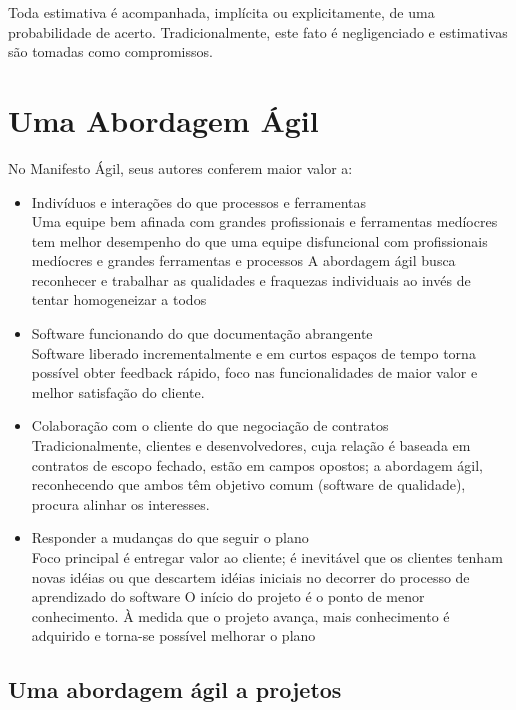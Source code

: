 \documentclass[a4paper,abntfigtabnum,noindentfirst]{abnt}
\begin{document}
Toda estimativa é acompanhada, implícita ou explicitamente, de uma probabilidade de acerto. Tradicionalmente, este fato é negligenciado e estimativas são tomadas como compromissos.


\chapter{Uma Abordagem Ágil}

No Manifesto Ágil, seus autores conferem maior valor a:

\begin{itemize}
\item Indivíduos e interações do que processos e ferramentas\\
Uma equipe bem afinada com grandes profissionais e ferramentas medíocres tem melhor desempenho do que uma equipe disfuncional com profissionais medíocres e grandes ferramentas e processos A abordagem ágil busca reconhecer e trabalhar as qualidades e fraquezas individuais ao invés de tentar homogeneizar a todos

\item Software funcionando do que documentação abrangente\\
Software liberado incrementalmente e em curtos espaços de tempo torna possível obter feedback rápido, foco nas funcionalidades de maior valor e melhor satisfação do cliente.

\item Colaboração com o cliente do que negociação de contratos\\
Tradicionalmente, clientes e desenvolvedores, cuja relação é baseada em contratos de escopo fechado, estão em campos opostos; a abordagem ágil, reconhecendo que ambos têm objetivo comum (software de qualidade), procura alinhar os interesses.

\item Responder a mudanças do que seguir o plano\\
Foco principal é entregar valor ao cliente; é inevitável que os clientes tenham novas idéias ou que descartem idéias iniciais no decorrer do processo de aprendizado do software O início do projeto é o ponto de menor conhecimento. À medida que o projeto avança, mais conhecimento é adquirido e torna-se possível melhorar o plano
\end{itemize}


\section{Uma abordagem ágil a projetos}
\end{document}
